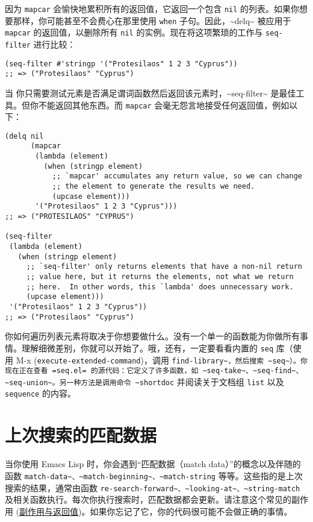 \documentclass[11pt]{ctexart}
\begin{document}
因为 \texttt{mapcar} 会愉快地累积所有的返回值，它返回一个包含 \texttt{nil} 的列表。如果你想要那样，你可能甚至不会费心在那里使用 \texttt{when} 子句。因此，\textasciitilde{}delq\textasciitilde{} 被应用于 \texttt{mapcar} 的返回值，以删除所有 \texttt{nil} 的实例。现在将这项繁琐的工作与 \texttt{seq-filter} 进行比较：

\begin{verbatim}
(seq-filter #'stringp '("Protesilaos" 1 2 3 "Cyprus"))
;; => ("Protesilaos" "Cyprus")
\end{verbatim}

当 你只需要测试元素是否满足谓词函数然后返回该元素时，\textasciitilde{}seq-filter\textasciitilde{} 是最佳工具。但你不能返回其他东西。而 \texttt{mapcar} 会毫无怨言地接受任何返回值，例如以下：

\begin{verbatim}
(delq nil
      (mapcar
       (lambda (element)
         (when (stringp element)
           ;; `mapcar' accumulates any return value, so we can change
           ;; the element to generate the results we need.
           (upcase element)))
       '("Protesilaos" 1 2 3 "Cyprus")))
;; => ("PROTESILAOS" "CYPRUS")

(seq-filter
 (lambda (element)
   (when (stringp element)
     ;; `seq-filter' only returns elements that have a non-nil return
     ;; value here, but it returns the elements, not what we return
     ;; here.  In other words, this `lambda' does unnecessary work.
     (upcase element)))
 '("Protesilaos" 1 2 3 "Cyprus"))
;; => ("Protesilaos" "Cyprus")
\end{verbatim}

你如何遍历列表元素将取决于你想要做什么。没有一个单一的函数能为你做所有事情。理解细微差别，你就可以开始了。哦，还有，一定要看看内置的 \texttt{seq} 库（使用 M-x (\texttt{execute-extended-command})，调用 \texttt{find-library\textasciitilde{}，然后搜索 \textasciitilde{}seq\textasciitilde{}）。你现在正在查看 =seq.el= 的源代码：它定义了许多函数，如 \textasciitilde{}seq-take\textasciitilde{}、\textasciitilde{}seq-find\textasciitilde{}、\textasciitilde{}seq-union\textasciitilde{}。另一种方法是调用命令 \textasciitilde{}shortdoc} 并阅读关于文档组 \texttt{list} 以及 \texttt{sequence} 的内容。
\section{上次搜索的匹配数据}
\label{sec:org5d051bd}
当你使用 Emacs Lisp 时，你会遇到“匹配数据（match data）”的概念以及伴随的函数 \texttt{match-data\textasciitilde{}、\textasciitilde{}match-beginning\textasciitilde{}、\textasciitilde{}match-string} 等等。这些指的是上次搜索的结果，通常由函数 \texttt{re-search-forward\textasciitilde{}、\textasciitilde{}looking-at\textasciitilde{}、\textasciitilde{}string-match} 及相关函数执行。每次你执行搜索时，匹配数据都会更新。请注意这个常见的副作用 (\hyperref[sec:org7601617]{副作用与返回值})。如果你忘记了它，你的代码很可能不会做正确的事情。
\end{document}
